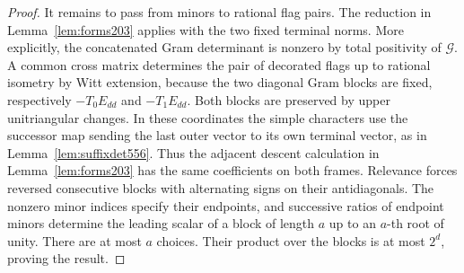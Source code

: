 \documentclass[a4paper,11pt]{article}
\theoremstyle{definition}
\theoremstyle{remark}
\numberwithin{equation}{section}
\begin{document}
\begin{proof}
It remains to pass from minors to rational flag pairs.
The reduction in Lemma~\ref{lem:forms203} applies with
the two fixed terminal norms. More explicitly, the
concatenated Gram determinant is nonzero by total positivity
of \(\mathcal G\). A common cross matrix determines the
pair of decorated flags up to rational isometry by Witt
extension, because the two diagonal Gram blocks are fixed,
respectively \(-T_0E_{dd}\) and \(-T_1E_{dd}\).
Both blocks are preserved by upper unitriangular changes.
In these coordinates the simple characters use the
successor map sending the last outer vector to its own
terminal vector, as in Lemma~\ref{lem:suffixdet556}.
Thus the adjacent descent calculation in
Lemma~\ref{lem:forms203} has the same coefficients on
both frames. Relevance forces reversed consecutive blocks
with alternating signs on their antidiagonals. The nonzero
minor indices specify their endpoints, and successive
ratios of endpoint minors determine the leading scalar
of a block of length \(a\) up to an \(a\)-th root of unity.
There are at most \(a\) choices. Their product over the
blocks is at most \(2^d\), proving the result.
\end{proof}
\end{document}
